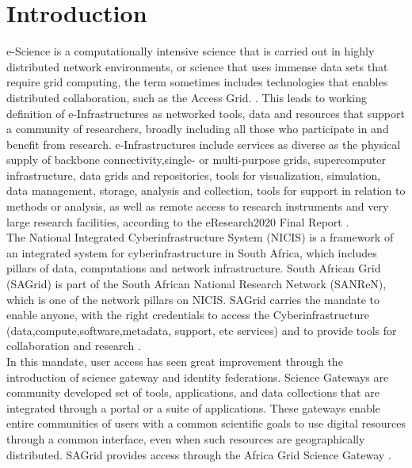 \documentclass [titlepage,11pt]{article}
\begin{document}
\section{Introduction}

e-Science  is a computationally intensive science that is carried out in highly distributed network environments, or science that uses immense data sets that require grid computing, the term sometimes includes technologies that enables distributed collaboration, such as the Access Grid. \citep{escience}. This leads to working definition of e-Infrastructures as networked tools, data and resources that support a community of researchers, broadly including all those who participate in and benefit from research. e-Infrastructures include services as diverse as the physical supply of backbone connectivity,single- or multi-purpose grids, supercomputer infrastructure, data grids and repositories, tools for visualization, simulation, data management, storage, analysis and collection, tools for support in relation to methods or analysis, as well as remote access to research instruments and very large research facilities, according to the eResearch2020 Final Report \citep{eresearch}.\\ 

The National Integrated Cyberinfrastructure System (NICIS) is a framework of an integrated system for cyberinfrastructure in South Africa, which includes pillars of data, computations and network infrastructure. South African Grid (SAGrid) is part of the South African National Research Network (SANReN), which is one of the network pillars on NICIS. SAGrid carries the mandate to enable anyone, with the right credentials to access the Cyberinfrastructure (data,compute,software,metadata, support, etc services) and to provide tools for collaboration and research \citep{nicis}. \\

In this mandate, user access has seen great improvement through the introduction of science gateway and identity federations. Science Gateways \citep{scienceG} are community developed set of tools, applications, and data collections that are integrated through a portal or a suite of applications. These gateways enable entire communities of users with a common scientific goals to use digital resources through a common interface, even when such resources are geographically distributed. SAGrid provides access through the Africa Grid Science Gateway \citep{africa_gateway}.\\
\end{document}
